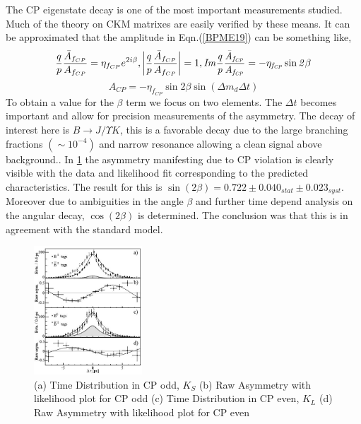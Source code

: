 The CP eigenstate decay is one of the most important measurements studied. Much of the theory on CKM matrixes are easily verified by these means. It can be approximated \cite{B2} that the amplitude in Eqn.(\ref{BPME19}) can be something like,
\begin{equation}\label{BPME20}
\frac{q}{p}\frac{\bar{A}_{f_{CP}}}{A_{f_{CP}}}=\eta_{f_{CP}}e^{2i\beta}, \left|\frac{q}{p}\frac{\bar{A}_{f_{CP}}}{A_{f_{CP}}}\right|=1, \it{I}m\frac{q}{p}\frac{\bar{A}_{f_{CP}}}{A_{f_{CP}}}=-\eta_{f_{CP}}\sin2\beta
\end{equation}
\begin{equation}\label{BPME21}
A_{CP}=-\eta_{f_{CP}}\sin2\beta\sin(\Delta m_d \Delta t)
\end{equation}
To obtain a value for the $\beta $ term we focus on two elements. The $\Delta t$ becomes important and allow for precision measurements of the asymmetry. The decay of interest here is $B\rightarrow J/\Upsilon K$, this is a favorable decay due to the large branching fractions $(\sim 10^{-4})$ and narrow resonance allowing a clean signal above background.\cite{B3}. In \ref{BBD5} the asymmetry manifesting due to CP violation is clearly visible with the data and likelihood fit corresponding to the predicted characteristics. The result for this is $\sin (2\beta) =0.722\pm 0.040_{stat} \pm0.023_{syst}$. Moreover due to ambiguities in the angle $\beta$  and further time depend analysis on the angular decay, $\cos(2\beta)$ is determined. The conclusion was that this is in agreement with the standard model\cite{B8}\cite{B16}.

 \begin{figure}[h]
\centering
\includegraphics[width=0.36\textwidth]{figs/cpf.JPG}
\caption{(a) Time Distribution in CP odd, $K_{S}$ (b) Raw Asymmetry with likelihood plot for CP odd (c) Time Distribution in CP even, $K_{L}$  (d) Raw Asymmetry with likelihood plot for CP even \cite{B9}}
\label{BBD5}
\end{figure}

